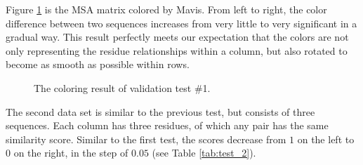 Figure \ref{fig:test_1} is the MSA matrix colored by Mavis. From left to right, the color difference between two sequences increases from very little to very significant in a gradual way. This result perfectly meets our expectation that the colors are not only representing the residue relationships within a column, but also rotated to become as smooth as possible within rows.

\begin{figure}[htb]
\caption[Coloring Result of Validation Test \#1]{The coloring result of validation test \#1.}\label{fig:test_1}
\end{figure}

The second data set is similar to the previous test, but consists of three sequences. Each column has three residues, of which any pair has the same similarity score. Similar to the first test, the scores decrease from $1$ on the left to $0$ on the right, in the step of $0.05$ (see Table \ref{tab:test_2}).

